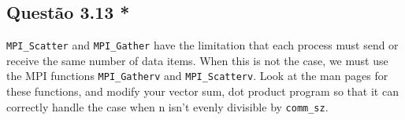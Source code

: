 

\subsection{Questão 3.13 *}

\texttt{MPI\_Scatter} and \texttt{MPI\_Gather} have the limitation that each process must send or receive the same number of data items. When this is not the case, we must use the MPI functions \texttt{MPI\_Gatherv} and \texttt{MPI\_Scatterv}. Look at the man pages for these functions, and modify your vector sum, dot product program so that it can correctly handle the case when n isn’t evenly divisible by \texttt{comm\_sz}.



